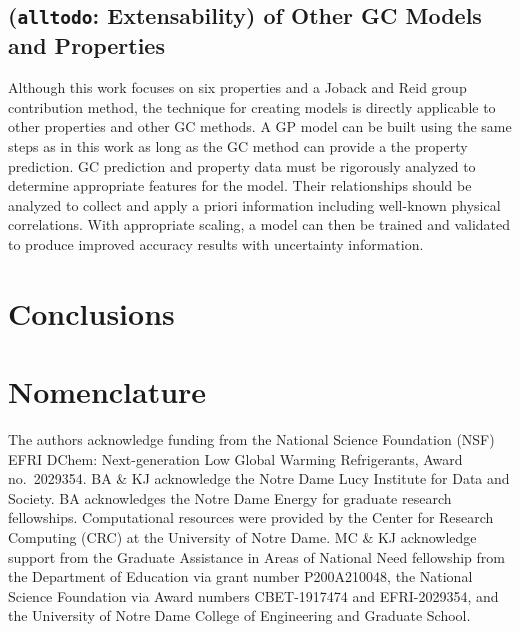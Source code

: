 \documentclass[journal=jacsat,manuscript=article]{achemso}
\newcommand{\alltodo}[1]{{\color{Cyan} (\texttt{alltodo}: #1)}}
\begin{document}
\subsection{\alltodo{Extensability} of Other GC Models and Properties}
Although this work focuses on six properties and a Joback and Reid group contribution method, the technique for creating models is directly applicable to other properties and other GC methods. A GP model can be built using the same steps as in this work as long as the GC method can provide a the property prediction. GC prediction and property data must be rigorously analyzed to determine appropriate features for the model. Their relationships should be analyzed to collect and apply a priori information including well-known physical correlations. With appropriate scaling, a model can then be trained and validated to produce improved accuracy results with uncertainty information.

\section{Conclusions}


\section{Nomenclature}

\begin{acknowledgement}
The authors acknowledge funding from the National Science Foundation (NSF) EFRI DChem: Next-generation Low Global Warming Refrigerants, Award no.~2029354. BA \& KJ acknowledge the Notre Dame Lucy Institute for Data and Society. BA acknowledges the Notre Dame Energy for graduate research fellowships. Computational resources were provided by the Center for Research Computing (CRC) at the University of Notre Dame. MC \& KJ acknowledge support from the Graduate Assistance in Areas of National Need fellowship from the Department of Education via grant number P200A210048, the National Science Foundation via Award numbers CBET-1917474 and EFRI-2029354, and the University of Notre Dame College of Engineering and Graduate School.  
\end{acknowledgement}
\end{document}

